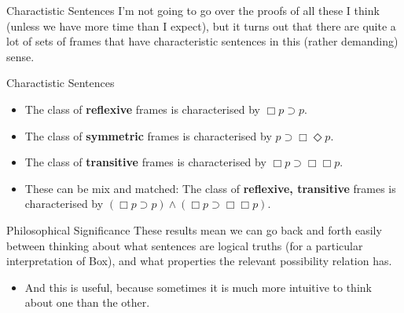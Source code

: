 \documentclass[
  14pt,
  letterpaper,
  ignorenonframetext,
]{beamer}
\providecommand{\tightlist}{%
  \setlength{\itemsep}{0pt}\setlength{\parskip}{0pt}}\usepackage{longtable,booktabs,array}
\begin{document}
\begin{frame}{Charactistic Sentences}
\protect\hypertarget{charactistic-sentences}{}
I'm not going to go over the proofs of all these I think (unless we have
more time than I expect), but it turns out that there are quite a lot of
sets of frames that have characteristic sentences in this (rather
demanding) sense.
\end{frame}

\begin{frame}{Charactistic Sentences}
\protect\hypertarget{charactistic-sentences-1}{}
\begin{itemize}
\tightlist
\item
  The class of \textbf{reflexive} frames is characterised by
  \(\Box p \supset p\).
\item
  The class of \textbf{symmetric} frames is characterised by
  \(p \supset \Box \Diamond p\).
\item
  The class of \textbf{transitive} frames is characterised by
  \(\Box p \supset \Box \Box p\).
\item
  These can be mix and matched: The class of \textbf{reflexive,
  transitive} frames is characterised by
  \((\Box p \supset p) \wedge (\Box p \supset \Box \Box p)\).
\end{itemize}
\end{frame}

\begin{frame}{Philosophical Significance}
\protect\hypertarget{philosophical-significance}{}
These results mean we can go back and forth easily between thinking
about what sentences are logical truths (for a particular interpretation
of Box), and what properties the relevant possibility relation has.

\begin{itemize}
\tightlist
\item
  And this is useful, because sometimes it is much more intuitive to
  think about one than the other.
\end{itemize}
\end{frame}
\end{document}
